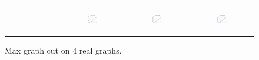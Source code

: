 \begin{figure}[ht]
\begin{tabular}{cccc}
\begin{subfigure}[b]{0.22\textwidth}
			\caption{}
			\label{appfig:validated_CC2G_friendster10M_maxgraphcut}
	  \end{subfigure} &
	  \begin{subfigure}[b]{0.22\textwidth}
	  	\includegraphics[width=105pt]{images/validated_CC2G_arabic2005_maxgraphcut.pdf}
			\caption{}
			\label{appfig:validated_CC2G_arabic2005_maxgraphcut}
	  \end{subfigure} &
	  \begin{subfigure}[b]{0.22\textwidth}
	  	\includegraphics[width=105pt]{images/validated_CC2G_uk2005_maxgraphcut.pdf}
			\caption{}
			\label{appfig:validated_CC2G_uk2005_maxgraphcut}
	  \end{subfigure} &
	  \begin{subfigure}[b]{0.22\textwidth}
	  	\includegraphics[width=105pt]{images/validated_CC2G_it2004_maxgraphcut.pdf}
			\caption{}
			\label{appfig:validated_CC2G_it2004_maxgraphcut}
	  \end{subfigure} \\
  \end{tabular}
  \caption{Max graph cut on 4 real graphs.}
\end{figure}





